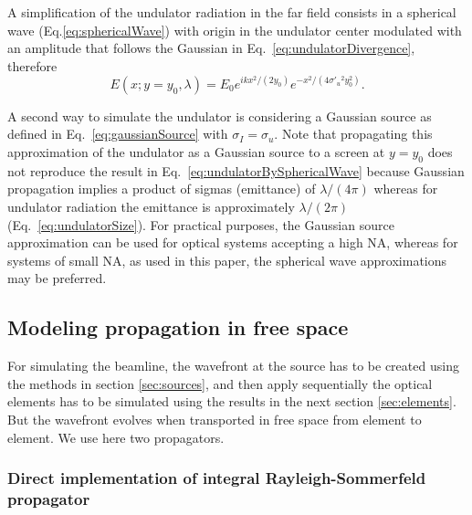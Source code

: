 \documentclass{iucr}
\begin{document}
A  simplification of the undulator radiation in the far field consists in a spherical wave (Eq.\ref{eq:sphericalWave}) with origin in the undulator center modulated with an amplitude that follows the Gaussian in Eq.~\ref{eq:undulatorDivergence}, therefore
\begin{equation}
    \label{eq:undulatorBySphericalWave}
    E(x;y=y_0,\lambda) = E_0 e^{i k x^2 / (2 y_0)} e^{-x^2/(4 \sigma'_u{}^2 y_0^2)}.
\end{equation}

A second way to simulate the undulator is considering a Gaussian source as defined in Eq.~\ref{eq:gaussianSource} with $\sigma_I=\sigma_u$. Note that propagating this approximation of the undulator as a Gaussian source to a screen at $y=y_0$ does not reproduce the result in Eq.~\ref{eq:undulatorBySphericalWave} because Gaussian propagation implies a product of sigmas (emittance) of $\lambda / (4 \pi)$ whereas for undulator radiation the emittance is approximately $\lambda / (2 \pi)$ (Eq.~\ref{eq:undulatorSize}). For practical purposes, the Gaussian source approximation can be used for optical systems accepting a high NA, whereas for systems of small NA, as used in this paper, the spherical wave approximations may be preferred.


\subsection{Modeling propagation in free space}
\label{sec:propagation}

For simulating the beamline, the wavefront at the source has to be created using the methods in section \ref{sec:sources}, and then apply sequentially the optical elements has to be simulated using the results in the next section \ref{sec:elements}. But the wavefront evolves when transported in free space from element to element. We use here two propagators. 

\subsubsection{Direct implementation of integral Rayleigh-Sommerfeld propagator}
\label{sec:integralPropagator}
\end{document}
